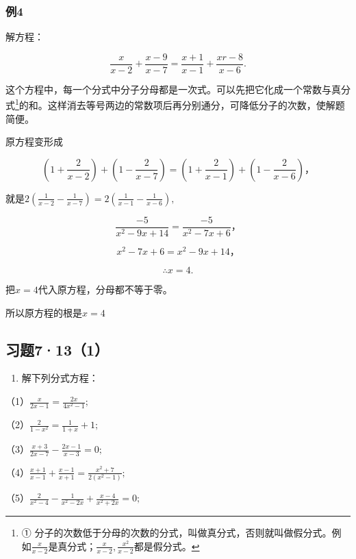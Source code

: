 \subsubsection{例4}

解方程：

\[
\frac{x}{x - 2} + \frac{x - 9}{x - 7} = \frac{x + 1}{x - 1} + \frac{x r - 8}{x - 6}.
\]

这个方程中，每一个分式中分子分母都是一次式。可以先把它化成一个常数与真分式\footnote{①
  分子的次数低于分母的次数的分式，叫做真分式，否则就叫做假分式。例如\(\frac{x}{x - 2}\)是真分式；\(\frac{x}{x - 2}, \frac{x^2}{x - 2}\)都是假分式。}的和。这样消去等号两边的常数项后再分别通分，可降低分子的次数，使解题简便。

 原方程变形成

\[
\left(1 + \frac{2}{x - 2}\right) + \left(1 - \frac{2}{x - 7}\right) = \left(1 + \frac{2}{x - 1}\right) + \left(1 - \frac{2}{x - 6}\right)\text{，}
\]

就是\(2\left(\frac{1}{x - 2} -\frac{1}{x - 7}\right) = 2\left(\frac{1}{x - 1} -\frac{1}{x - 6}\right),\)

\[
\frac{- 5}{x ^ {2} - 9 x + 14} = \frac{- 5}{x ^ {2} - 7 x + 6}\text{，}
\]

\[
x ^ {2} - 7 x + 6 = x ^ {2} - 9 x + 14\text{，}
\]

\[
\therefore x = 4.
\]

 把\(x = 4\)代入原方程，分母都不等于零。

所以原方程的根是\(x = 4\)

\subsection{习题7·13（1）}

\begin{enumerate}
\item
  解下列分式方程：
\end{enumerate}

（1）\(\frac{x}{2x - 1} = \frac{2x}{4x^2 - 1};\)

（2）\(\frac{2}{1 - x^2} = \frac{1}{1 + x} + 1;\)

（3）\(\frac{x + 3}{2x - 7} - \frac{2x - 1}{x - 3} = 0;\)

（4）\(\frac{x + 1}{x - 1} +\frac{x - 1}{x + 1} = \frac{x^2 + 7}{2(x^2 - 1)};\)

（5）\(\frac{2}{x^2 - 4} - \frac{1}{x^2 - 2x} + \frac{x - 4}{x^2 + 2x} = 0;\)

